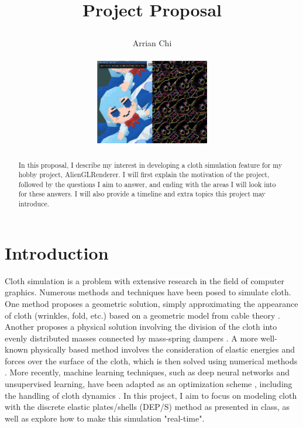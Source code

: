 \documentclass[letterpaper, 10 pt, conference, english]{ieeeconf}  %
\title{\LARGE \bf
Project Proposal

}
\author{Arrian Chi%
\\ 
\\
\includegraphics[width=5cm]{fumo.png} 
}
\begin{document}



\maketitle


\thispagestyle{empty}
\pagestyle{empty}






\begin{abstract}
In this proposal, I describe my interest in developing a cloth simulation feature for my hobby project, AlienGLRenderer. I will first explain the motivation of the project, followed by the questions I aim to answer, and ending with the areas I will look into for these answers. I will also provide a timeline and extra topics this project may introduce. 

\end{abstract}
\section{Introduction}
Cloth simulation is a problem with extensive research in the field of computer graphics. Numerous methods and techniques have been posed to simulate cloth. One method proposes a geometric solution, simply approximating the appearance of cloth (wrinkles, fold, etc.) based on a geometric model from cable theory \cite{weil1986synthesis}. Another proposes a physical solution involving the division of the cloth into evenly distributed masses connected by mass-spring dampers \cite{provot1995deformation}. A more well-known physically based method involves the consideration of elastic energies \cite{terzopoulos1987elastically} and forces over the surface of the cloth, which is then solved using numerical methods \cite{baraff1998large}. More recently, machine learning techniques, such as deep neural networks and unsupervised learning, have been adapted as an optimization scheme \cite{oh2018hierarchical}, including the handling of cloth dynamics \cite{bertiche2022neural}. In this project, I aim to focus on modeling cloth with the discrete elastic plates/shells (DEP/S) method as presented in class, as well as explore how to make this simulation "real-time".
\end{document}
